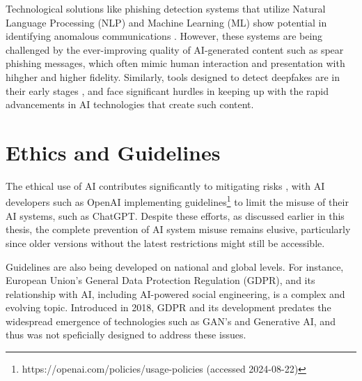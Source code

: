 Technological solutions like phishing detection systems that utilize Natural Language Processing (NLP) and Machine Learning (ML) show potential in identifying anomalous communications \citep{basitComprehensiveSurveyAIenabledPhishingAttacks2021}. However, these systems are being challenged by the ever-improving quality of AI-generated content such as spear phishing messages, which often mimic human interaction and presentation with hihgher and higher fidelity. Similarly, tools designed to detect deepfakes are in their early stages \citep{mirskyTheCreationAndDetectionOfDeepfakes2021}, and face significant hurdles in keeping up with the rapid advancements in AI technologies that create such content.

















\section{Ethics and Guidelines}

\begin{comment}    
    - Deepfake content detection
    - Spear phishing detection
\end{comment}

The ethical use of AI contributes significantly to mitigating risks \citep{guptaFromChatGPTtoThreatGPT2023}, with AI developers such as OpenAI implementing guidelines\footnote{https://openai.com/policies/usage-policies (accessed 2024-08-22)} to limit the misuse of their AI systems, such as ChatGPT. Despite these efforts, as discussed earlier in this thesis, the complete prevention of AI system misuse remains elusive, particularly since older versions without the latest restrictions might still be accessible.

Guidelines are also being developed on national and global levels. For instance, European Union's General Data Protection Regulation (GDPR), and its relationship with AI, including AI-powered social engineering, is a complex and evolving topic. Introduced in 2018, GDPR and its development predates the widespread emergence of technologies such as GAN's and Generative AI\citep{goodfellowGenerativeAdversarialNetworks2020}, and thus was not speficially designed to address these issues.

